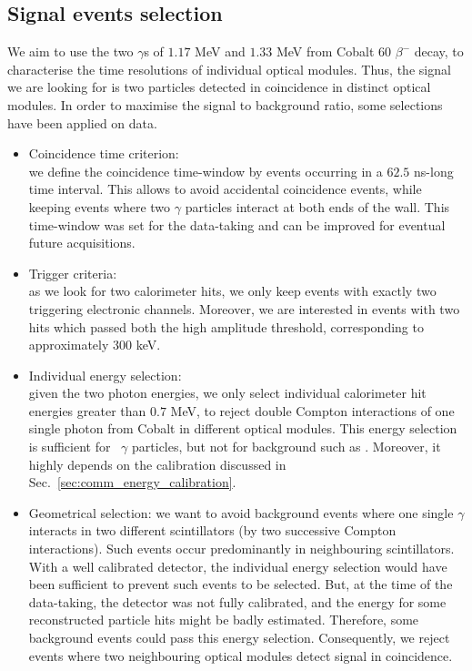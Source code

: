 \subsection{Signal events selection}
\label{subsec:Co_datacut}

We aim to use the two $\gamma$s of $1.17$ MeV and $1.33$ MeV from Cobalt $60$ $\beta^{-}$ decay, to characterise the time resolutions of individual optical modules.
Thus, the signal we are looking for is two particles detected in coincidence in distinct optical modules.
In order to maximise the signal to background ratio, some selections have been applied on data.
\begin{itemize}
\item Coincidence time criterion:\\ we define the coincidence time-window by events occurring in a $62.5$ ns-long time interval.
  This allows to avoid accidental coincidence events, while keeping events where two $\gamma$ particles interact at both ends of the wall.
  This time-window was set for the data-taking and can be improved for eventual future acquisitions.
\item Trigger criteria:\\ as we look for two calorimeter hits, we only keep events with exactly two triggering electronic channels.
  Moreover, we are interested in events with two hits which passed both the high amplitude threshold, corresponding to approximately $300$ keV.
\item Individual energy selection:\\ given the two photon energies, we only select individual calorimeter hit energies greater than $0.7$ MeV, to reject double Compton interactions of one single photon from Cobalt in different optical modules.
  This energy selection is sufficient for \Co\ $\gamma$ particles, but not for background such as \Tl.
  Moreover, it highly depends on the calibration discussed in Sec.~\ref{sec:comm_energy_calibration}.
\item Geometrical selection:
  we want to avoid background events where one single $\gamma$ interacts in two different scintillators (by two successive Compton interactions).
  Such events occur predominantly in neighbouring scintillators.
  With a well calibrated detector, the individual energy selection would have been sufficient to prevent such events to be selected.
  But, at the time of the data-taking, the detector was not fully calibrated, and the energy for some reconstructed particle hits might be badly estimated.
  Therefore, some background events could pass this energy selection.
  Consequently, we reject events where two neighbouring optical modules detect signal in coincidence.
\end{itemize}
